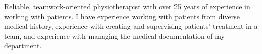 \vspace{-10mm}
\cventryone
{}
{
Reliable, teamwork-oriented physiotherapist with over 25 years of experience in working with patients. I have experience working with patients from diverse medical history, experience with creating and supervising patients' treatment in a team, and experience with managing the medical documentation of my department. 
}
\vspace{+4mm}